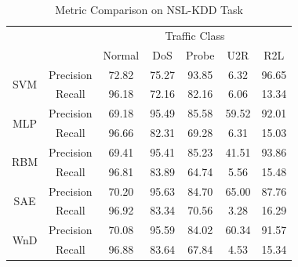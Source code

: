 \begin{table}[]
    \centering
    \caption{Metric Comparison on NSL-KDD Task}
    \label{Tab:PrecisionRecall}
    \begin{tabular}{c|c|ccccc}
        \hline
        \hline
                             &            & \multicolumn{5}{c}{Traffic Class} \\
        \cline{3-7}
                             &            & Normal & DoS   & Probe & U2R   & R2L \\
        \hline
        \multirow{2}{*}{SVM} & Precision  & 72.82  & 75.27 & 93.85 &  6.32 & 96.65 \\
        \cline{2-2}
                             & Recall     & 96.18  & 72.16 & 82.16 &  6.06 & 13.34 \\
        \hline
        \multirow{2}{*}{MLP} & Precision  & 69.18  & 95.49 & 85.58 & 59.52 & 92.01 \\
        \cline{2-2}
                             & Recall     & 96.66  & 82.31 & 69.28 &  6.31 & 15.03 \\
        \hline
        \multirow{2}{*}{RBM} & Precision  & 69.41  & 95.41 & 85.23 & 41.51 & 93.86 \\
        \cline{2-2}
                             & Recall     & 96.81  & 83.89 & 64.74 &  5.56 & 15.48 \\
        \hline
        \multirow{2}{*}{SAE} & Precision  & 70.20  & 95.63 & 84.70 & 65.00 & 87.76 \\
        \cline{2-2}
                             & Recall     & 96.92  & 83.34 & 70.56 &  3.28 & 16.29 \\
        \hline
        \multirow{2}{*}{WnD} & Precision  & 70.08  & 95.59 & 84.02 & 60.34 & 91.57 \\
        \cline{2-2}
                             & Recall     & 96.88  & 83.64 & 67.84 &  4.53 & 15.34 \\
        \hline
    \end{tabular}
\end{table}

